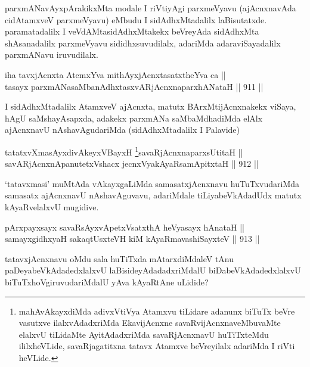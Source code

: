 \begin{artha}
parxmANavAyxpArakikxMta modale I riVtiyAgi parxmeVyavu (ajAcnxnavAda cidAtamxveV parxmeVyavu) eMbudu I sidAdhxMtadalilx laBisutatxde. paramatadalilx I veVdAMtasidAdhxMtakekx beVreyAda sidAdhxMta shAsanadalilx parxmeVyavu sididhxsuvudilalx, adariMda adaraviSayadalilx parxmANavu iruvudilalx.
\end{artha}


\begin{shl}
iha tavxjAcnxta AtemxYva mithAyxjAcnxtasatxtheYva ca || \\
tasayx parxmANasaMbanAdhxtasxvARjAcnxnaparxhANataH \hfill || 911 ||  
\end{shl}

\begin{artha}
I sidAdhxMtadalilx AtamxveV ajAcnxta, matutx BArxMtijAcnxnakekx viSaya, hAgU saMshayAsapxda, adakekx parxmANa saMbaMdhadiMda elAlx ajAcnxnavU nAshavAgudariMda (sidAdhxMtadalilx I Palavide)
\end{artha}


\begin{shl}
tatatxvXmasAyxdivAkeyxVBayxH \footnote{mahAvAkayxdiMda adivxVtiVya Atamxvu tiLidare adanunx biTuTx beVre vasutxve ilalxvAdadxriMda EkavijAcnxne savaRvijAcnxnaveMbuvaMte elalxvU tiLidaMte AyitAdadxriMda savaRjAcnxnavU huTiTxteMdu ililxheVLide, savaRjagatitxna tatavx Atamxve beVreyilalx adariMda I riVti heVLide.}savaRjAcnxnaparxsUtitaH || \\
savARjAcnxnApanutetxVshacx jecnxVyakAyaRsamApitxtaH \hfill || 912 ||  
\end{shl}

\begin{artha}
`tatavxmasi' muMtAda vAkayxgaLiMda samasatxjAcnxnavu huTuTxvudariMda samasatx ajAcnxnavU nAshavAguvavu, adariMdale tiLiyabeVkAdadUdx matutx kAyaRvelalxvU mugidive.
\end{artha}


\begin{shl}
pArxpayxsayx savaRsAyxvApetxVsatxthA heVyasayx hAnataH || \\
samayxgidhxyaH sakaqtUsxteVH kiM kAyaRmavashiSayxteV \hfill || 913 ||  
\end{shl}

\begin{artha}
tatavxjAcnxnavu oMdu sala huTiTxda mAtarxdiMdaleV tAnu paDeyabeVkAdadedxlalxvU laBisideyAdadadxriMdalU biDabeVkAdadedxlalxvU biTuTxhoVgiruvudariMdalU yAva kAyaRtAne uLidide?
\end{artha}

